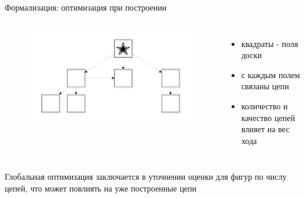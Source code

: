 \begin{frame}{Формализация: оптимизация при построении}
\begin{columns}
\begin{figure}
\includegraphics[scale=0.2]{./pictures/piece.png}
\end{figure}
\begin{itemize}
\item квадраты - поля доски
\item с каждым полем связаны цепи
\item количество и качество цепей влияет на вес хода
\end{itemize}
\end{columns}
Глобальная оптимизация заключается в уточнении оценки для фигур по числу цепей, что может повлиять на уже построенные цепи
\end{frame}

